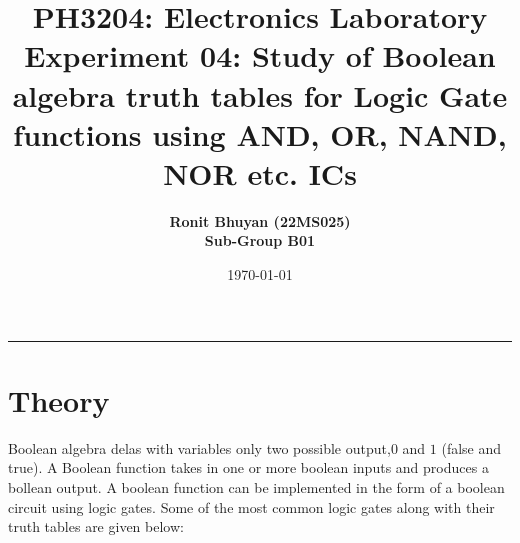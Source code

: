\documentclass[12pt]{article}
\title{
  \vspace{-2cm}
  \Huge \textbf{PH3204: Electronics Laboratory} \\[0.4cm]
  \Large \textbf{Experiment 04:  Study of Boolean algebra truth tables for Logic Gate functions using AND, OR, NAND,
  NOR etc. ICs}
}
\author{
  \textbf{Ronit Bhuyan (22MS025)} \\[0.2cm]
  \textbf{Sub-Group B01}
}
\date{\today}
\begin{document}
\maketitle

\tableofcontents
\noindent\rule{\textwidth}{0.4pt}
\newpage

\section{Theory}
Boolean algebra delas with variables only two possible output,$0$ and $1$ (false and true). A Boolean function takes in one or more boolean inputs and produces a bollean output. A boolean function can be implemented in the form of a boolean circuit using logic gates. Some of the most common logic gates along with their truth tables are given below:
\end{document}
